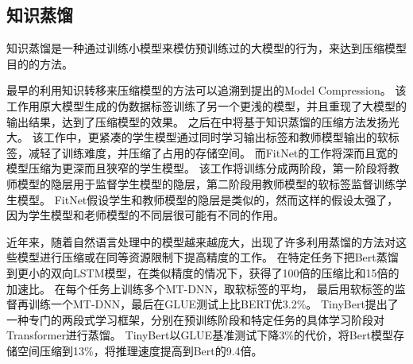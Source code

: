 \subsection{知识蒸馏}
知识蒸馏是一种通过训练小模型来模仿预训练过的大模型的行为，来达到压缩模型目的的方法。

最早的利用知识转移来压缩模型的方法可以追溯到\citeauthor{buciluǎ2006model}提出的Model Compression\cite{buciluǎ2006model}。
该工作用原大模型生成的伪数据标签训练了另一个更浅的模型，并且重现了大模型的输出结果，达到了压缩模型的效果。
之后\citeauthor{hinton2015distilling}在\parencite{hinton2015distilling}中将基于知识蒸馏的压缩方法发扬光大。
该工作中，更紧凑的学生模型通过同时学习输出标签和教师模型输出的软标签，减轻了训练难度，并压缩了占用的存储空间。
而FitNet\cite{romero2014fitnets}的工作将深而且宽的模型压缩为更深而且狭窄的学生模型。
该工作将训练分成两阶段，第一阶段将教师模型的隐层用于监督学生模型的隐层，第二阶段用教师模型的软标签监督训练学生模型。
FitNet假设学生和教师模型的隐层是类似的，然而这样的假设太强了，因为学生模型和老师模型的不同层很可能有不同的作用。

近年来，随着自然语言处理中的模型越来越庞大，出现了许多利用蒸馏的方法对这些模型进行压缩或在同等资源限制下提高精度的工作。
\parencite{tang2019distilling}在特定任务下把Bert蒸馏到更小的双向LSTM模型，在类似精度的情况下，获得了100倍的压缩比和15倍的加速比。
\parencite{liu2019improving}在每个任务上训练多个MT-DNN，取软标签的平均，
最后用软标签的监督再训练一个MT-DNN，最后在GLUE测试上比BERT优3.2\%。
TinyBert\cite{jiao2019tinybert}提出了一种专门的两段式学习框架，分别在预训练阶段和特定任务的具体学习阶段对Transformer进行蒸馏。
TinyBert以GLUE基准测试下降3\%的代价，将Bert模型存储空间压缩到13\%，将推理速度提高到Bert的9.4倍。
